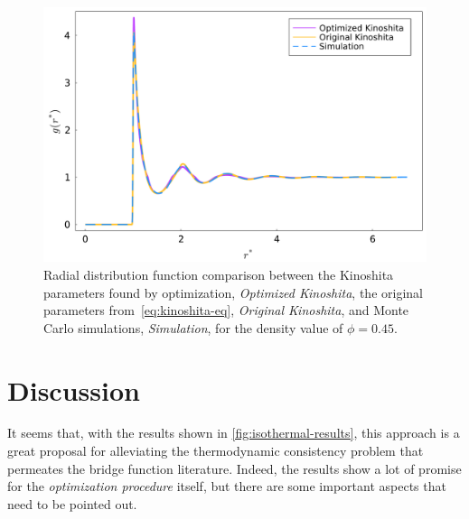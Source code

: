 \begin{figure}
    \centering
    \includegraphics[scale=0.35]{figuras/capitulo-5/rdf_phi=0.45.pdf}
    \caption{Radial distribution function comparison between the Kinoshita parameters found by optimization, \emph{Optimized Kinoshita}, the original parameters from~\autoref{eq:kinoshita-eq}, \emph{Original Kinoshita}, and Monte Carlo simulations, \emph{Simulation}, for the density value of \(\phi=0.45 .\)}
    \label{fig:rdf-kinoshita-045}
\end{figure}

\section{Discussion}
It seems that, with the results shown in \autoref{fig:isothermal-results}, this approach is 
a great proposal for alleviating the thermodynamic consistency problem that permeates the 
bridge function literature. Indeed, the results show a lot of promise for the
\emph{optimization procedure} itself, but there are some important aspects that need to be 
pointed out.

